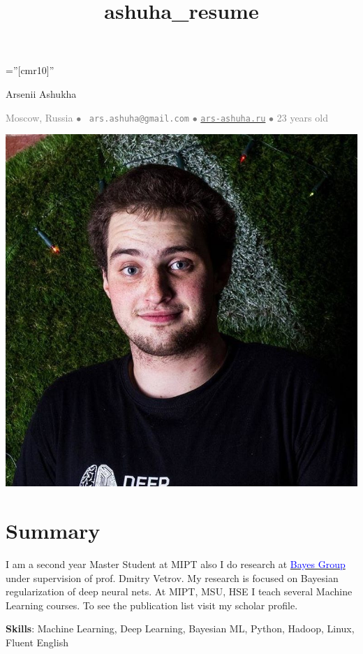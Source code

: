 \documentclass[a4paper,10pt]{article} %
\title{ashuha_resume}
\begin{document}
\pagestyle{empty} %

\font\fb=''[cmr10]'' %
\oddsidemargin=0pt 		%

\begin{center}
	{\huge Arsenii Ashukha}
\end{center}
\begin{center}
\textcolor{gray}{
Moscow, Russia $\bullet$ 
\Letter~\textcolor{gray}{\texttt{ars.ashuha@gmail.com}} $\bullet$ \href{https://ars-ashuha.ru/}{\textcolor{gray}{\texttt{ars-ashuha.ru}}} $\bullet$
23 years old \smiley} 

\end{center}
\setlength{\columnsep}{-330pt}
\begin{multicols}{2}
\includegraphics[scale=0.13]{img/avatar_rect2}

\section{Summary}
 \vspace{-0.2cm}

I am a second year Master Student at MIPT also I do research at \href{bayesgroup.ru}{\textcolor{blue}{Bayes Group}} under supervision of prof. Dmitry Vetrov. My research is focused on Bayesian regularization of deep neural nets. At MIPT, MSU, HSE I teach several Machine Learning courses. To see the publication list visit my scholar profile.

\vspace{0.2cm}
\textbf{Skills}: Machine Learning, Deep Learning, Bayesian ML, Python, Hadoop, Linux, Fluent English

\end{multicols}
\end{document}
